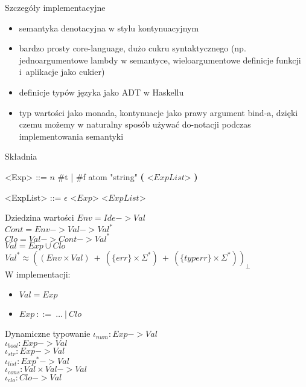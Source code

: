 \documentclass[12pt,serif]{beamer}
\begin{document}
\begin{frame}{Szczegóły implementacyjne}
\begin{itemize}
  \item semantyka denotacyjna w stylu kontynuacyjnym
  \item bardzo prosty core-language, dużo cukru syntaktycznego
        (np. jednoargumentowe lambdy w semantyce,
        wieloargumentowe definicje funkcji i~aplikacje jako cukier)
  \item definicje typów języka jako ADT w Haskellu
  \item typ wartości jako monada, kontynuacje jako prawy argument bind-a,
        dzięki czemu możemy w naturalny sposób używać do-notacji podczas
        implementowania semantyki
\end{itemize}
\end{frame}

\begin{frame}{Składnia}
\setlength{\grammarindent}{8em}
\begin{grammar}
<Exp> ::= $n$
\alt \#t | \#f
\alt atom
\alt "string"
\alt \textbf{(} <$ExpList$> \textbf{)}

<ExpList> ::= $\epsilon$
\alt <$Exp$> <$ExpList$>
\end{grammar}
\end{frame}

\begin{frame}{Dziedzina wartości}
$Env = Ide -> Val$ \\
$Cont = Env -> Val -> Val^{*}$ \\
$Clo = Val -> Cont -> Val^{*}$ \\
$Val = Exp \cup Clo$ \\
$Val^{*} \approx ((Env \times Val)~+~(\{err\} \times \Sigma^{*})~+~(\{typerr\} \times \Sigma^{*}))_{\bot}$\newline
\\
\pause
W implementacji:
\begin{itemize}
  \item $Val = Exp$
  \item $Exp~::=~\ldots~|~Clo$
\end{itemize}
\end{frame}


\begin{frame}{Dynamiczne typowanie}
$\iota_{num} : Exp -> Val$ \\
$\iota_{bool} : Exp -> Val$ \\
$\iota_{str} : Exp -> Val$ \\
$\iota_{list} : Exp^{*} -> Val$ \\
$\iota_{cons} : Val \times Val -> Val$ \\
$\iota_{clo} : Clo -> Val$ \\
\end{frame}
\end{document}
